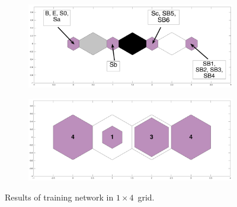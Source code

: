 \label{app: 1d}
    \begin{figure}
        \begin{subfigure}[b]{0.5\textwidth}
            \centering
            \includegraphics[width=\textwidth]{../image_paper2/1d/apps/dist_1_by_4.png}
        \end{subfigure}
        \hfill
        \begin{subfigure}[b]{0.5\textwidth}
             \includegraphics[width=\textwidth]{../image_paper2/1d/apps/hit_t_1_by_4.png}
        \end{subfigure}
                \caption{Results of training network in $1\times4$~grid.}
         \label{fig: 1by4T}
    \end{figure}
    

